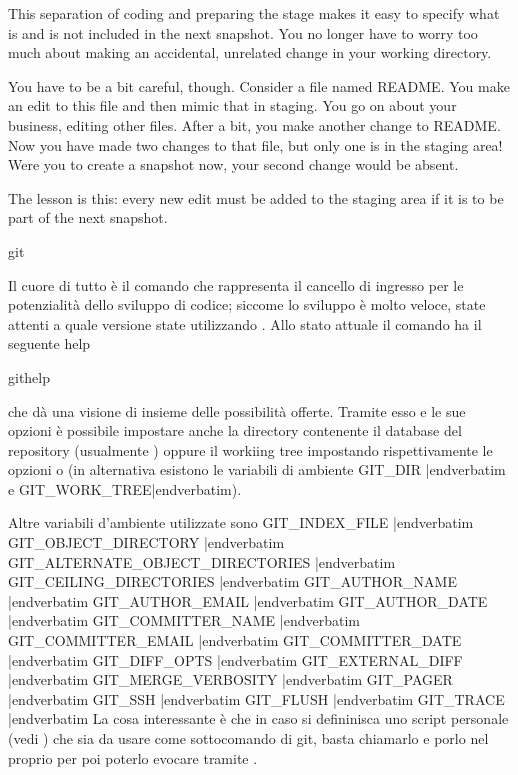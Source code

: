 This separation of coding and preparing the stage makes it easy to specify what is and is not included in the next snapshot. You no longer have to worry too much about making an accidental, unrelated change in your working directory.

You have to be a bit careful, though. Consider a file named README. You make an edit to this file and then mimic that in staging. You go on about your business, editing other files. After a bit, you make another change to README. Now you have made two changes to that file, but only one is in the staging area! Were you to create a snapshot now, your second change would be absent.

The lesson is this: every new edit must be added to the staging area if it is to be part of the next snapshot.

\sezione git

Il cuore di tutto \`e il comando  che rappresenta il cancello di
ingresso per le potenzialit\`a dello sviluppo di codice; siccome lo sviluppo \`e
molto veloce, state attenti a quale versione state utilizzando \gitversion. Allo
stato attuale il comando ha il seguente help

 githelp

che d\`a una visione di insieme
delle possibilit\`a offerte. Tramite esso e le
sue opzioni \`e possibile impostare anche la directory contenente il database
del repository (usualmente ) oppure il workiing tree impostando
rispettivamente le opzioni  o  (in
alternativa esistono le variabili di ambiente \verbatim GIT_DIR |endverbatim e
\verbatim GIT_WORK_TREE|endverbatim).

Altre variabili d'ambiente utilizzate sono
\iniziaelenco
\li\verbatim GIT_INDEX_FILE |endverbatim
\li\verbatim GIT_OBJECT_DIRECTORY |endverbatim
\li\verbatim GIT_ALTERNATE_OBJECT_DIRECTORIES |endverbatim
\li\verbatim GIT_CEILING_DIRECTORIES |endverbatim
\li\verbatim GIT_AUTHOR_NAME |endverbatim
\li\verbatim GIT_AUTHOR_EMAIL |endverbatim
\li\verbatim GIT_AUTHOR_DATE |endverbatim
\li\verbatim GIT_COMMITTER_NAME |endverbatim
\li\verbatim GIT_COMMITTER_EMAIL |endverbatim
\li\verbatim GIT_COMMITTER_DATE |endverbatim
\li\verbatim GIT_DIFF_OPTS |endverbatim
\li\verbatim GIT_EXTERNAL_DIFF |endverbatim
\li\verbatim GIT_MERGE_VERBOSITY |endverbatim
\li\verbatim GIT_PAGER |endverbatim
\li\verbatim GIT_SSH |endverbatim
\li\verbatim GIT_FLUSH |endverbatim
\li\verbatim GIT_TRACE |endverbatim
\fineelenco
La cosa interessante \`e che in caso si defininisca uno script personale
(vedi ) che sia da usare come sottocomando di git, basta
chiamarlo  e porlo nel proprio  per poi poterlo
evocare tramite .

